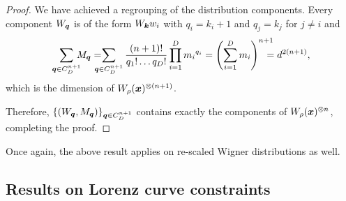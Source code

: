 \documentclass[pra,
aps,
twocolumn,
superscriptaddress,
groupedaddress,
nofootinbib,
reprint
]{revtex4-1}
\begin{document}
\begin{proof}
We have achieved a regrouping of the distribution components.
Every component $W_{\bm{q}}$ is of the form $W_{\bm{k}} w_i$ with $q_i = k_i + 1$ and $q_j = k_j$ for $j\neq i$ and 
\begin{align*}
	\sum_{\bmq \in C_D^{n+1}}  \hspace{-6pt} M_{\bmq} =  \hspace{-10pt} \sum_{\bmq \in C_D^{n+1}} \frac{(n+1)!}{q_1!\dots q_D!} \prod\limits_{i=1}^D {m_i}^{q_i} = 
	\left( \sum_{i=1}^D m_i \right)^{n+1} \hspace{-10pt} = d^{2(n+1)},
\end{align*}
which is the dimension of $W_{\rho}(\bm{x})^{\otimes (n+1)}$.

Therefore, $\{ (W_{\bm{q}}, M_{\bm{q}}) \}_{\bm{q} \in C_D^{n+1}}$ contains exactly the components of $W_{\rho}(\bm{x})^{\otimes n}$, completing the proof.
\end{proof}
Once again, the above result applies on re-scaled Wigner distributions as well.

\subsection{Results on Lorenz curve constraints}
\label{app:lc_constraints}
\end{document}
